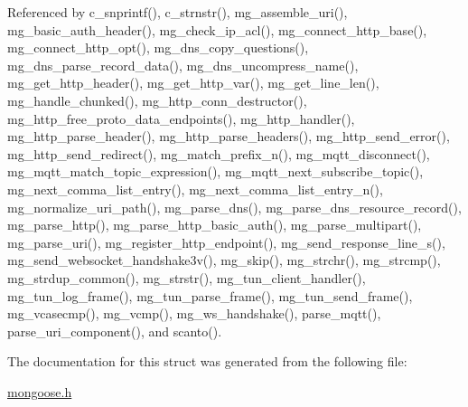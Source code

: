 Referenced by c\+\_\+snprintf(), c\+\_\+strnstr(), mg\+\_\+assemble\+\_\+uri(), mg\+\_\+basic\+\_\+auth\+\_\+header(), mg\+\_\+check\+\_\+ip\+\_\+acl(), mg\+\_\+connect\+\_\+http\+\_\+base(), mg\+\_\+connect\+\_\+http\+\_\+opt(), mg\+\_\+dns\+\_\+copy\+\_\+questions(), mg\+\_\+dns\+\_\+parse\+\_\+record\+\_\+data(), mg\+\_\+dns\+\_\+uncompress\+\_\+name(), mg\+\_\+get\+\_\+http\+\_\+header(), mg\+\_\+get\+\_\+http\+\_\+var(), mg\+\_\+get\+\_\+line\+\_\+len(), mg\+\_\+handle\+\_\+chunked(), mg\+\_\+http\+\_\+conn\+\_\+destructor(), mg\+\_\+http\+\_\+free\+\_\+proto\+\_\+data\+\_\+endpoints(), mg\+\_\+http\+\_\+handler(), mg\+\_\+http\+\_\+parse\+\_\+header(), mg\+\_\+http\+\_\+parse\+\_\+headers(), mg\+\_\+http\+\_\+send\+\_\+error(), mg\+\_\+http\+\_\+send\+\_\+redirect(), mg\+\_\+match\+\_\+prefix\+\_\+n(), mg\+\_\+mqtt\+\_\+disconnect(), mg\+\_\+mqtt\+\_\+match\+\_\+topic\+\_\+expression(), mg\+\_\+mqtt\+\_\+next\+\_\+subscribe\+\_\+topic(), mg\+\_\+next\+\_\+comma\+\_\+list\+\_\+entry(), mg\+\_\+next\+\_\+comma\+\_\+list\+\_\+entry\+\_\+n(), mg\+\_\+normalize\+\_\+uri\+\_\+path(), mg\+\_\+parse\+\_\+dns(), mg\+\_\+parse\+\_\+dns\+\_\+resource\+\_\+record(), mg\+\_\+parse\+\_\+http(), mg\+\_\+parse\+\_\+http\+\_\+basic\+\_\+auth(), mg\+\_\+parse\+\_\+multipart(), mg\+\_\+parse\+\_\+uri(), mg\+\_\+register\+\_\+http\+\_\+endpoint(), mg\+\_\+send\+\_\+response\+\_\+line\+\_\+s(), mg\+\_\+send\+\_\+websocket\+\_\+handshake3v(), mg\+\_\+skip(), mg\+\_\+strchr(), mg\+\_\+strcmp(), mg\+\_\+strdup\+\_\+common(), mg\+\_\+strstr(), mg\+\_\+tun\+\_\+client\+\_\+handler(), mg\+\_\+tun\+\_\+log\+\_\+frame(), mg\+\_\+tun\+\_\+parse\+\_\+frame(), mg\+\_\+tun\+\_\+send\+\_\+frame(), mg\+\_\+vcasecmp(), mg\+\_\+vcmp(), mg\+\_\+ws\+\_\+handshake(), parse\+\_\+mqtt(), parse\+\_\+uri\+\_\+component(), and scanto().



The documentation for this struct was generated from the following file\+:\begin{DoxyCompactItemize}
\item 
\hyperlink{mongoose_8h}{mongoose.\+h}\end{DoxyCompactItemize}
